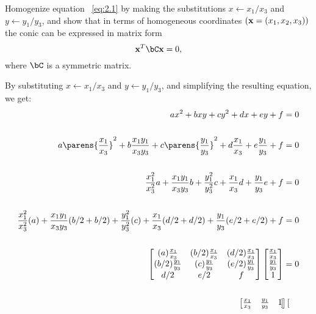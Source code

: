 \begin{problem}
\begin{enumalph}
    \newpage
    \item Homogenize equation ~\ref{eq:2.1} by making the
      substitutions $x \gets x_1/x_3$ and $y \gets y_1/y_3$,
      and show that in terms of homogeneous coordinates
      $(\mathbf{x} = (x_1, x_2, x_3))$ the conic can be expressed in
      matrix form
      \[ \bx^T\bC\bx = 0, \]
      where $\bC$ is a symmetric matrix.
      \begin{answer}
        By substituting $x \gets x_1/x_3$ and $y \gets y_1/y_3$,
        and simplifying the resulting equation, we get:
        \begin{align*}
          ax^2 + bxy + cy^2 + dx + ey + f &= 0 \\ \\
          a\parens{\frac{x_1}{x_3}}^2 + b\frac{x_1y_1}{x_3y_3}
          + c\parens{\frac{y_1}{y_3}}^2
          + d\frac{x_1}{x_3} + e\frac{y_1}{y_3} + f &= 0 \\ \\
          \frac{x_1^2}{x_3^2}a + \frac{x_1y_1}{x_3y_3}b
          + \frac{y_1^2}{y_3^2}c
          + \frac{x_1}{x_3}d + \frac{y_1}{y_3}e + f &= 0 \\ \\
          \frac{x_1^2}{x_3^2}(a) + \frac{x_1y_1}{x_3y_3}(b/2 + b/2)
          + \frac{y_1^2}{y_3^2}(c) + \frac{x_1}{x_3}(d/2 + d/2)
          + \frac{y_1}{y_3}(e/2 + e/2) + f &= 0 \\ \\
          \begin{bmatrix}
            (a) \frac{x_1}{x_3} & (b/2) \frac{x_1}{x_3} & (d/2) \frac{x_1}{x_3} \\
            (b/2) \frac{y_1}{y_3} & (c) \frac{y_1}{y_3} & (e/2) \frac{y_1}{y_3} \\
            d/2 & e/2 & f \\
          \end{bmatrix}
          \begin{bmatrix}
            \frac{x_1}{x_3} \\
            \frac{y_1}{y_3} \\
            1 \\
          \end{bmatrix} &= 0 \\ \\
          \begin{bmatrix}
            \frac{x_1}{x_3} & \frac{y_1}{y_3} & 1 \\
          \end{bmatrix}
          \begin{bmatrix}

\end{bmatrix}
\end{align*}
\end{answer}
\end{enumalph}
\end{problem}
